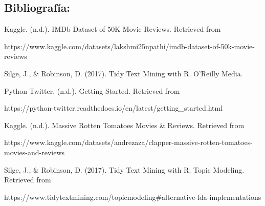 \documentclass[
  letterpaper,
  DIV=11,
  numbers=noendperiod]{scrartcl}
\begin{document}
\subsection{Bibliografía:}\label{bibliografuxeda}

Kaggle. (n.d.). IMDb Dataset of 50K Movie Reviews. Retrieved from

https://www.kaggle.com/datasets/lakshmi25npathi/imdb-dataset-of-50k-movie-reviews

Silge, J., \& Robinson, D. (2017). Tidy Text Mining with R. O'Reilly
Media.

Python Twitter. (n.d.). Getting Started. Retrieved from

https://python-twitter.readthedocs.io/en/latest/getting\_started.html

Kaggle. (n.d.). Massive Rotten Tomatoes Movies \& Reviews. Retrieved
from

https://www.kaggle.com/datasets/andrezaza/clapper-massive-rotten-tomatoes-movies-and-reviews

Silge, J., \& Robinson, D. (2017). Tidy Text Mining with R: Topic
Modeling. Retrieved from

https://www.tidytextmining.com/topicmodeling\#alternative-lda-implementations
\end{document}
